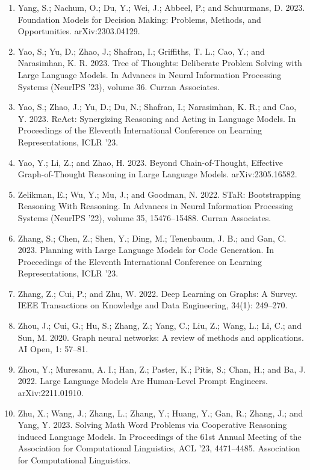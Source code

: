 \documentclass[11pt,UTF8,fontset=fandol]{ctexart}
\begin{document}
\begin{enumerate}[leftmargin=2em]
\item Yang, S.; Nachum, O.; Du, Y.; Wei, J.; Abbeel, P.; and Schuurmans, D. 2023. Foundation Models for Decision Making: Problems, Methods, and Opportunities. arXiv:2303.04129.
\item Yao, S.; Yu, D.; Zhao, J.; Shafran, I.; Griffiths, T. L.; Cao, Y.; and Narasimhan, K. R. 2023. Tree of Thoughts: Deliberate Problem Solving with Large Language Models. In Advances in Neural Information Processing Systems (NeurIPS '23), volume 36. Curran Associates.
\item Yao, S.; Zhao, J.; Yu, D.; Du, N.; Shafran, I.; Narasimhan, K. R.; and Cao, Y. 2023. ReAct: Synergizing Reasoning and Acting in Language Models. In Proceedings of the Eleventh International Conference on Learning Representations, ICLR '23.
\item Yao, Y.; Li, Z.; and Zhao, H. 2023. Beyond Chain-of-Thought, Effective Graph-of-Thought Reasoning in Large Language Models. arXiv:2305.16582.
\item Zelikman, E.; Wu, Y.; Mu, J.; and Goodman, N. 2022. STaR: Bootstrapping Reasoning With Reasoning. In Advances in Neural Information Processing Systems (NeurIPS '22), volume 35, 15476--15488. Curran Associates.
\item Zhang, S.; Chen, Z.; Shen, Y.; Ding, M.; Tenenbaum, J. B.; and Gan, C. 2023. Planning with Large Language Models for Code Generation. In Proceedings of the Eleventh International Conference on Learning Representations, ICLR '23.
\item Zhang, Z.; Cui, P.; and Zhu, W. 2022. Deep Learning on Graphs: A Survey. IEEE Transactions on Knowledge and Data Engineering, 34(1): 249--270.
\item Zhou, J.; Cui, G.; Hu, S.; Zhang, Z.; Yang, C.; Liu, Z.; Wang, L.; Li, C.; and Sun, M. 2020. Graph neural networks: A review of methods and applications. AI Open, 1: 57--81.
\item Zhou, Y.; Muresanu, A. I.; Han, Z.; Paster, K.; Pitis, S.; Chan, H.; and Ba, J. 2022. Large Language Models Are Human-Level Prompt Engineers. arXiv:2211.01910.
\item Zhu, X.; Wang, J.; Zhang, L.; Zhang, Y.; Huang, Y.; Gan, R.; Zhang, J.; and Yang, Y. 2023. Solving Math Word Problems via Cooperative Reasoning induced Language Models. In Proceedings of the 61st Annual Meeting of the Association for Computational Linguistics, ACL '23, 4471--4485. Association for Computational Linguistics.
\end{enumerate}
\end{document}
